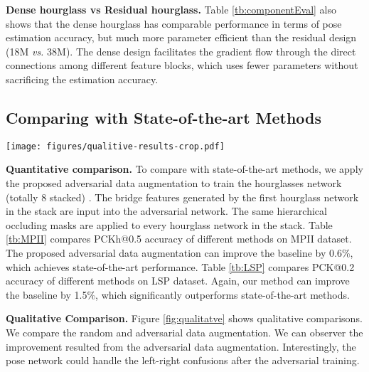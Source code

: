 \documentclass[10pt,twocolumn,letterpaper]{article}
\begin{document}
{\bf Dense hourglass vs Residual hourglass.} Table \ref{tb:componentEval} also shows that the dense hourglass has comparable performance in terms of pose estimation accuracy, but much more parameter efficient than the residual design (18M {\it vs.} 38M). The dense design facilitates the gradient flow through the direct connections among different feature blocks, which uses fewer parameters without sacrificing the estimation accuracy.  

\subsection{Comparing with State-of-the-art Methods}\begin{figure*}[hbt]
\centering
  \texttt{[image: figures/qualitive-results-crop.pdf]}
\caption{Comparisons of the same Stacked HG network trained using random data augmentation ({\bf top}) and adversarial data augmentation ({\bf bottom}). Note the improvement on challenging joints ({\it e.g.} ankle, elbow, wrist), and left-right confusion.}
\label{fig:qualitatve}
\end{figure*}{\bf Quantitative comparison.}%
To compare with state-of-the-art methods, we apply the proposed adversarial data augmentation to train the hourglasses network (totally 8 stacked) \cite{newell2016stacked}. 
The bridge features generated by the first hourglass network in the stack are input into the adversarial network.
The same hierarchical occluding masks are applied to every hourglass network in the stack.
Table \ref{tb:MPII} compares PCKh@0.5 accuracy of different methods on MPII dataset.
The proposed adversarial data augmentation can improve the baseline \cite{newell2016stacked} by 0.6\%, which achieves state-of-the-art performance. 
Table \ref{tb:LSP} compares PCK@0.2 accuracy of different methods on LSP dataset. Again, our method can improve the baseline \cite{newell2016stacked} by 1.5\%, which significantly outperforms state-of-the-art methods.

{\bf Qualitative Comparison.} Figure \ref{fig:qualitatve} shows qualitative comparisons. We compare the random and adversarial data augmentation. We can observer the improvement resulted from the adversarial data augmentation. Interestingly, the pose network could handle the left-right confusions after the adversarial training.
\end{document}
